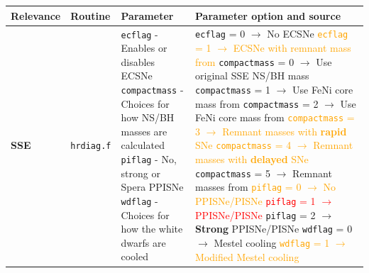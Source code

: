 	\begin{landscape}
		\begin{table}
			\centering
			\begin{tabular}{|l|l|l|l|}
				\hline \textbf{Relevance} & \textbf{Routine} & \textbf{Parameter} & \textbf{Parameter option and source} \\
				\hline \hline \textbf{SSE} & \texttt{hrdiag.f} & \makecell[l]{\texttt{ecflag} - Enables or disables ECSNe \\ \texttt{compactmass} - Choices for how NS/BH masses are calculated \\ \texttt{piflag} - No, strong or Spera PPISNe \\ \texttt{wdflag} - Choices for how the white dwarfs are cooled} & \makecell[l]{\texttt{ecflag} = 0 $\rightarrow$ No ECSNe \\ \textcolor{orange}{\texttt{ecflag} = 1 $\rightarrow$ ECSNe with remnant mass from} \cite{Belczynskietal2008} \\ \texttt{compactmass} =  0 $\rightarrow$ Use original SSE NS/BH mass \cite{Hurley2000} \\ \texttt{compactmass} = 1 $\rightarrow$ Use FeNi core mass from \cite{Belczynskietal2002} \\ \texttt{compactmass} = 2 $\rightarrow$ Use FeNi core mass from \cite{Belczynskietal2008} \\  \textcolor{orange}{\texttt{compactmass} = 3 $\rightarrow$ Remnant masses with \textbf{rapid} SNe} \cite{Fryeretal2012} \\   \textcolor{orange}{\texttt{compactmass} = 4 $\rightarrow$ Remnant masses with \textbf{delayed} SNe} \cite{Fryeretal2012} \\  \texttt{compactmass} = 5 $\rightarrow$ Remnant masses from \cite{EldridgeTout2004b}\\ \textcolor{orange}{\texttt{piflag} = 0 $\rightarrow$ No PPISNe/PISNe} \\ \textcolor{red}{\texttt{piflag} = 1 $\rightarrow$ PPISNe/PISNe} \cite{SperaMapelli2017} \\ \texttt{piflag} = 2 $\rightarrow$ \textbf{Strong} PPISNe/PISNe \cite{Belczynskietal2016} \\ \texttt{wdflag} = 0 $\rightarrow$ Mestel cooling \cite{Mestel1952a} \\ \textcolor{orange}{\texttt{wdflag} = 1 $\rightarrow$ Modified Mestel cooling} \cite{Toutetal1997}} \\

\end{tabular}
\end{table}
\end{landscape}
